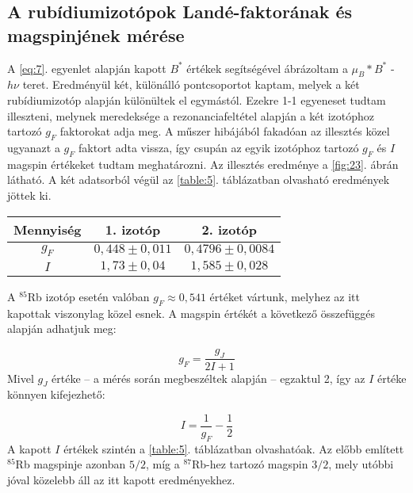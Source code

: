 \begin{multicols}{2}
\subsection{A rubídiumizotópok Landé-faktorának és magspinjének mérése}
A \ref{eq:7}. egyenlet alapján kapott $B^{\ast}$ értékek segítségével ábrázoltam a $\mu_{B} * B^{\ast}$ - $h \nu$ teret. Eredményül két, különálló pontcsoportot kaptam, melyek a két rubídiumizotóp alapján különültek el egymástól. Ezekre 1-1 egyeneset tudtam illeszteni, melynek meredeksége a rezonanciafeltétel alapján a két izotóphoz tartozó $g_{F}$ faktorokat adja meg. A műszer hibájából fakadóan az illesztés közel ugyanazt a $g_{F}$ faktort adta vissza, így csupán az egyik izotóphoz tartozó $g_{F}$ és $I$ magspin értékeket tudtam meghatározni. Az illesztés eredménye a \ref{fig:23}. ábrán látható. A két adatsorból végül az \ref{table:5}. táblázatban olvasható eredmények jöttek ki.

\begin{center}
\begin{tabular}{|c|c|c|}
\hline
Mennyiség & 1. izotóp         & 2. izotóp           \\ \hline \hline
$g_{F}$   & $0,448 \pm 0,011$ & $0,4796 \pm 0,0084$ \\ \hline
$I$       & $1,73 \pm 0,04$   & $1,585 \pm 0,028$   \\ \hline
\end{tabular}
 \label{table:5}
\end{center}
A $^{85}$Rb izotóp esetén valóban $g_{F} \approx 0,541$ értéket vártunk, melyhez az itt kapottak viszonylag közel esnek. A magspin értékét a következő összefüggés alapján adhatjuk meg:

\begin{equation}
g_{F}
=
\frac{g_{J}}{2I + 1}
\end{equation}
Mivel $g_{J}$ értéke -- a mérés során megbeszéltek alapján -- egzaktul 2, így az $I$ értéke könnyen kifejezhető:

\begin{equation}
I = \frac{1}{g_{F}} - \frac{1}{2}
\end{equation}
A kapott $I$ értékek szintén a \ref{table:5}. táblázatban olvashatóak. Az előbb említett $^{85}$Rb magspinje azonban $5/2$, míg a $^{87}$Rb-hez tartozó magspin $3/2$, mely utóbbi jóval közelebb áll az itt kapott eredményekhez.


\end{multicols}
